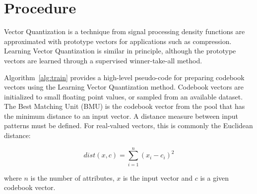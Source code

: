 \documentclass[a4paper, 11pt]{article}
\begin{document}
\section{Procedure}
\label{sec:procedure}
Vector Quantization is a technique from signal processing density functions are approximated with prototype vectors for applications such as compression. Learning Vector Quantization is similar in principle, although the prototype vectors are learned through a supervised winner-take-all method.

Algorithm~\ref{alg:train} provides a high-level pseudo-code for preparing codebook vectors using the Learning Vector Quantization method. 
Codebook vectors are initialized to small floating point values, or sampled from an available dataset. The Best Matching Unit (BMU) is the codebook vector from the pool that has the minimum distance to an input vector. A distance measure between input patterns must be defined. For real-valued vectors, this is commonly the Euclidean distance:

\begin{equation}
	dist(x,c) = \sum_{i=1}^{n} (x_i - c_i)^2
\end{equation}

where $n$ is the number of attributes, $x$ is the input vector and $c$ is a given codebook vector.
\end{document}
